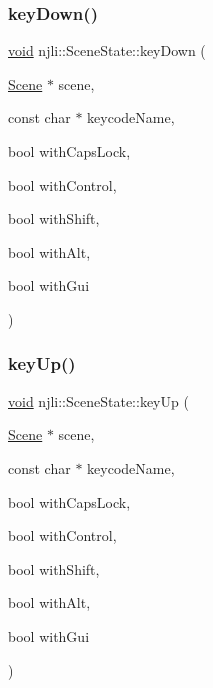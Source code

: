 \mbox{\label{classnjli_1_1_scene_state_a411685b6b560bd62977c53cb1fc78961}} 
\subsubsection{\texorpdfstring{key\+Down()}{keyDown()}}
{\footnotesize\ttfamily \mbox{\hyperlink{_thread_8h_af1e856da2e658414cb2456cb6f7ebc66}{void}} njli\+::\+Scene\+State\+::key\+Down (\begin{DoxyParamCaption}\item[{\mbox{\hyperlink{classnjli_1_1_scene}{Scene}} $\ast$}]{scene,  }\item[{const char $\ast$}]{keycode\+Name,  }\item[{bool}]{with\+Caps\+Lock,  }\item[{bool}]{with\+Control,  }\item[{bool}]{with\+Shift,  }\item[{bool}]{with\+Alt,  }\item[{bool}]{with\+Gui }\end{DoxyParamCaption})}

\mbox{\label{classnjli_1_1_scene_state_a0285084af113825bd125b559f408c9f7}} 
\subsubsection{\texorpdfstring{key\+Up()}{keyUp()}}
{\footnotesize\ttfamily \mbox{\hyperlink{_thread_8h_af1e856da2e658414cb2456cb6f7ebc66}{void}} njli\+::\+Scene\+State\+::key\+Up (\begin{DoxyParamCaption}\item[{\mbox{\hyperlink{classnjli_1_1_scene}{Scene}} $\ast$}]{scene,  }\item[{const char $\ast$}]{keycode\+Name,  }\item[{bool}]{with\+Caps\+Lock,  }\item[{bool}]{with\+Control,  }\item[{bool}]{with\+Shift,  }\item[{bool}]{with\+Alt,  }\item[{bool}]{with\+Gui }\end{DoxyParamCaption})}

